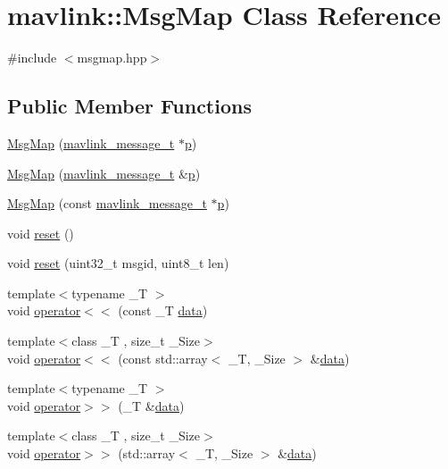 \hypertarget{classmavlink_1_1MsgMap}{}\section{mavlink\+::Msg\+Map Class Reference}
\label{classmavlink_1_1MsgMap}


{\ttfamily \#include $<$msgmap.\+hpp$>$}

\subsection*{Public Member Functions}
\begin{DoxyCompactItemize}
\item 
\mbox{\hyperlink{classmavlink_1_1MsgMap_a584e0a807eb17833430f919d1d0952f3}{Msg\+Map}} (\mbox{\hyperlink{include__v0_89_2mavlink__types_8h_a63b963764c09dc72f4910c1521e325b9}{mavlink\+\_\+message\+\_\+t}} $\ast$\mbox{\hyperlink{velTest_8cpp_a739e18b8b6d072d434ebcb6ca486abb0}{p}})
\item 
\mbox{\hyperlink{classmavlink_1_1MsgMap_ac901b93ec973e7dbdb8ef8ceace9d8b0}{Msg\+Map}} (\mbox{\hyperlink{include__v0_89_2mavlink__types_8h_a63b963764c09dc72f4910c1521e325b9}{mavlink\+\_\+message\+\_\+t}} \&\mbox{\hyperlink{velTest_8cpp_a739e18b8b6d072d434ebcb6ca486abb0}{p}})
\item 
\mbox{\hyperlink{classmavlink_1_1MsgMap_a7e797cf94f826dfe13ff2e412b49e743}{Msg\+Map}} (const \mbox{\hyperlink{include__v0_89_2mavlink__types_8h_a63b963764c09dc72f4910c1521e325b9}{mavlink\+\_\+message\+\_\+t}} $\ast$\mbox{\hyperlink{velTest_8cpp_a739e18b8b6d072d434ebcb6ca486abb0}{p}})
\item 
void \mbox{\hyperlink{classmavlink_1_1MsgMap_a2eae010a75187fdc08da24d9bb53a3ca}{reset}} ()
\item 
void \mbox{\hyperlink{classmavlink_1_1MsgMap_a10c2f9d9a43770eefa072b53d64a9291}{reset}} (uint32\+\_\+t msgid, uint8\+\_\+t len)
\item 
{\footnotesize template$<$typename \+\_\+T $>$ }\\void \mbox{\hyperlink{classmavlink_1_1MsgMap_a79d04c1d99bad57f67763dd3ffc202e5}{operator$<$$<$}} (const \+\_\+T \mbox{\hyperlink{structdata}{data}})
\item 
{\footnotesize template$<$class \+\_\+T , size\+\_\+t \+\_\+\+Size$>$ }\\void \mbox{\hyperlink{classmavlink_1_1MsgMap_aa79388f240280cc4848a63ce0a82073e}{operator$<$$<$}} (const std\+::array$<$ \+\_\+T, \+\_\+\+Size $>$ \&\mbox{\hyperlink{structdata}{data}})
\item 
{\footnotesize template$<$typename \+\_\+T $>$ }\\void \mbox{\hyperlink{classmavlink_1_1MsgMap_ada013c1d270ab080a6a11a60c67519d6}{operator$>$$>$}} (\+\_\+T \&\mbox{\hyperlink{structdata}{data}})
\item 
{\footnotesize template$<$class \+\_\+T , size\+\_\+t \+\_\+\+Size$>$ }\\void \mbox{\hyperlink{classmavlink_1_1MsgMap_a3e446ddceb5afa98cfdf86fcbe20b30d}{operator$>$$>$}} (std\+::array$<$ \+\_\+T, \+\_\+\+Size $>$ \&\mbox{\hyperlink{structdata}{data}})
\end{DoxyCompactItemize}


